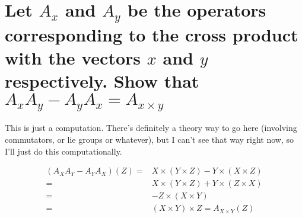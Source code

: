 \documentclass[12pt]{amsart}
\begin{document}
\section{Let $A_x$ and $A_y$ be the operators corresponding to the cross product with the vectors $x$ and $y$ respectively. Show that $A_xA_y-A_yA_x=A_{x\times y}$}
This is just a computation. There's definitely a theory way to go here (involving commutators, or lie groups or whatever), but I can't see that way right now, so I'll just do this computationally.
\begin{comment}\begin{align*}
	\left(A_xA_y-A_yA_x\right)(z)=&x\times(y\times z)-y\times(x\times z)
	\\=&x\times\left((y_2z_3-y_3z_2)i-(y_1z_3-y_3z_1)j+(y_2z_3-y_3z_2)k \right)
	\\&- y\times\left((x_2z_3-x_3z_2)i-(x_1z_3-x_3z_1)j+(x_2z_3-x_3z_2)k \right)
	\\=&(x_2y_2z_3-x_2y_3z_2+x_3y_1z_3-x_3y_3z_1)i
	\\&-(x_1y_2z_3-x_1y_3z_2-x_3y_2z_3+x_3y_3z_2)j
	\\&+
\end{align*}
\end{comment}
\begin{align*}
	(A_XA_Y-A_YA_X)(Z)=&X\times (Y\times Z)-Y\times(X\times Z)
	\\=&X\times(Y\times Z)+Y\times(Z\times X)
	\\=&-Z\times(X\times Y)
	\\=&(X\times Y)\times Z=A_{X\times Y}(Z)
\end{align*}
\end{document}
